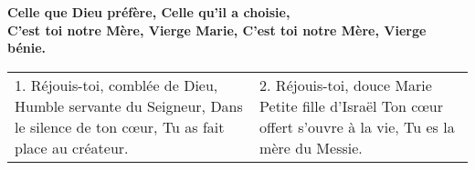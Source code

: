 \textbf{
Celle que Dieu préfère,
Celle qu’il a choisie,\\
C’est toi notre Mère,
Vierge Marie,
C’est toi notre Mère,
Vierge bénie.
}

\begin{tabular}{@{}p{} p{}@{}}
1.
Réjouis-toi, comblée de Dieu,\newline
Humble servante du Seigneur,\newline
Dans le silence de ton cœur,\newline
Tu as fait place au créateur.
&
2.
Réjouis-toi, douce Marie\newline
Petite fille d’Israël\newline
Ton cœur offert s’ouvre à la vie,\newline
Tu es la mère du Messie.
\end{tabular}

